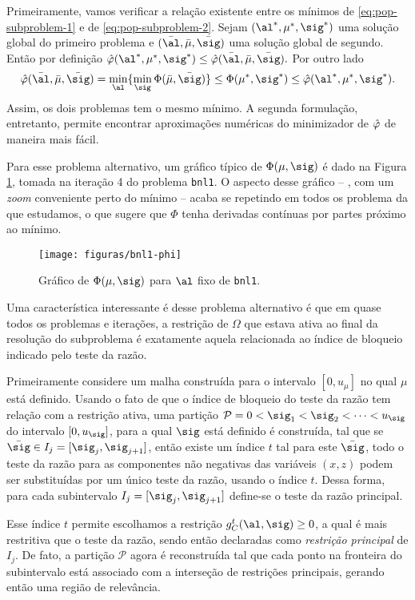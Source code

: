 Primeiramente, vamos verificar a relação existente entre os mínimos de \eqref{eq:pop-subproblem-1} e de \eqref{eq:pop-subproblem-2}. Sejam $(\al^*,\mu^*,\sig^*)$ uma solução global do  primeiro problema e $(\bar{\al}, \bar{\mu},\bar{\sig})$ uma solução global de segundo. Então por definição
$ \nextphi(\al^*,\mu^*,\sig^*) \leq \nextphi (\bar{\al},\bar{\mu},\bar{\sig}).$
Por outro lado 
\[
\nextphi(\baral,\barmu,\barsig) = \min_{\al}\{ \min_{\sig}\Phi(\barmu,\barsig)\} \leq \Phi(\mu^{*},\sig^{*}) \leq \nextphi(\al^*,\mu^*,\sig^*).
\]
Assim, os dois problemas tem o mesmo mínimo. A segunda formulação, entretanto, permite encontrar aproximações numéricas do minimizador de $\hat{\varphi}$ de maneira mais fácil. 

Para esse problema alternativo, um gráfico típico de $\Phi(\mu,\sig)$ é dado na Figura \ref{fig:bnl1-Phi}, tomada na iteração \num{4} do problema \texttt{bnl1}. O aspecto desse gráfico -- , com um \emph{zoom} conveniente perto do mínimo --  acaba se repetindo  em todos os problema da  que estudamos, o que sugere que $\Phi$ tenha derivadas contínuas por partes próximo ao mínimo.

\begin{figure}[htbp]
\centering
\texttt{[image: figuras/bnl1-phi]}
  	\caption{\label{fig:bnl1-Phi} Gráfico de $\Phi(\mu,\sig)$ para $\al$ fixo de \texttt{bnl1}.}
  \end{figure}

 Uma característica interessante é desse problema alternativo é que em quase todos os problemas e iterações, a restrição de $\Omega$ que estava ativa ao final da resolução do subproblema é exatamente aquela relacionada ao índice de bloqueio indicado pelo teste da razão.

Primeiramente considere  um malha construída para o intervalo $[0,u_{\mu}]$ no qual  $\mu$ está definido. Usando o fato de que o índice de bloqueio do teste da razão tem relação com a restrição ativa, uma partição $\mathcal{P} = 0<\sig_{1}<\sig_{2}<\cdots<u_{\sig}$ do intervalo $[0,u_{\sig}]$, para  a  qual $\sig$ está definido é construída, tal que se $\barsig\in I_{j} = [\sig_{j},\sig_{j+1}]$, então existe um índice $t$ tal para este $\barsig$, todo o teste da razão para as componentes não negativas das variáveis $(x,z)$ podem ser substituídas por um único teste da razão, usando o índice $t$. Dessa forma, para cada subintervalo $I_{j} = [\sig_{j},\sig_{j+1}]$ define-se o teste da razão principal. 

Esse índice $t$ permite escolhamos a restrição $g_{C}^{t}(\al,\sig)\geq0$, a qual é mais restritiva que o teste da razão,   sendo  então declaradas como \emph{restrição principal}  de $I_{j}$. De fato, a partição $\mathcal{P}$ agora é reconstruída tal que cada ponto na fronteira do subintervalo está associado com a interseção de restrições principais, gerando então uma região de relevância.

